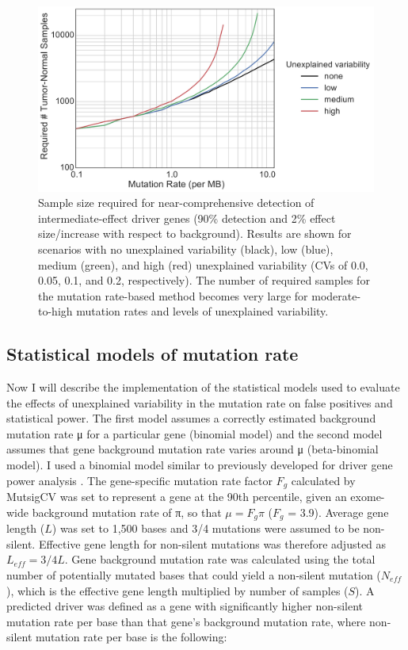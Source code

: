 \begin{figure}
  \centering
  \makeatletter
  \let\@currsize\normalsize
  \includegraphics[width=0.9\linewidth]{figures/chapter2/statistical_power.pdf}
  \caption[Sample size required for near-comprehensive detection of driver genes]{Sample size required for near-comprehensive detection of intermediate-effect driver genes (90\% detection and 2\% effect size/increase with respect to background). Results are shown for scenarios with no unexplained variability (black), low (blue), medium (green), and high (red) unexplained variability (CVs of 0.0, 0.05, 0.1, and 0.2, respectively). The number of required samples for the mutation rate-based method becomes very large for moderate-to-high mutation rates and levels of unexplained variability.}
  \label{fig:statistical_power}
\end{figure}

\subsection{Statistical models of mutation rate}

Now I will describe the implementation of the statistical models used to evaluate the effects of unexplained variability in the mutation rate on false positives and statistical power. The first model assumes a correctly estimated background mutation rate μ for a particular gene (binomial model) and the second model assumes that gene background mutation rate varies around μ (beta-binomial model). I used a binomial model similar to previously developed for driver gene power analysis \cite{RN14}. The gene-specific mutation rate factor $F_g$ calculated by MutsigCV \cite{RN14} was set to represent a gene at the 90th percentile, given an exome-wide background mutation rate of π, so that $μ=F_gπ$ ($F_g$ = 3.9). Average gene length ($L$) was set to 1,500 bases and 3/4 mutations were assumed to be non-silent. Effective gene length for non-silent mutations was therefore adjusted as $L_{eff}=3/4L$. Gene background mutation rate was calculated using the total number of potentially mutated bases that could yield a non-silent mutation ($N_{eff}$), which is the effective gene length multiplied by number of samples ($S$). A predicted driver was defined as a gene with significantly higher non-silent mutation rate per base than that gene's background mutation rate, where non-silent mutation rate per base is the following:

